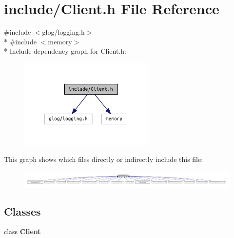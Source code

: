 \section{include/\+Client.h File Reference}
\label{_client_8h}
{\ttfamily \#include $<$glog/logging.\+h$>$}\\*
{\ttfamily \#include $<$memory$>$}\\*
Include dependency graph for Client.\+h\+:\nopagebreak
\begin{figure}[H]
\begin{center}
\leavevmode
\includegraphics[width=192pt]{_client_8h__incl}
\end{center}
\end{figure}
This graph shows which files directly or indirectly include this file\+:\nopagebreak
\begin{figure}[H]
\begin{center}
\leavevmode
\includegraphics[width=350pt]{_client_8h__dep__incl}
\end{center}
\end{figure}
\subsection*{Classes}
\begin{DoxyCompactItemize}
\item 
class {\bf Client}
\end{DoxyCompactItemize}
